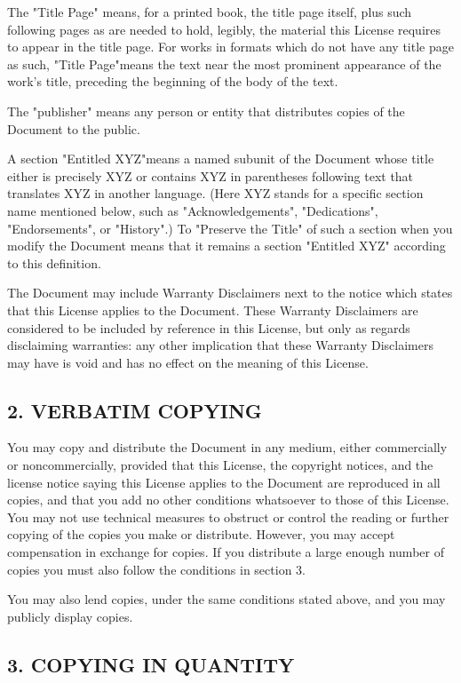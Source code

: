 The "Title Page" means, for a printed book, the title page itself, plus such following pages as are needed to hold, 
legibly, the material this License requires to appear in the title page. For works in formats which do not have any 
title page as such, "Title Page"means the text near the most prominent appearance of the work's title, preceding 
the beginning of the body of the text.

The "publisher" means any person or entity that distributes copies of the Document to the public.

A section "Entitled XYZ"means a named subunit of the Document whose title either is precisely XYZ or contains XYZ 
in parentheses following text that translates XYZ in another language. (Here XYZ stands for a specific section name 
mentioned below, such as "Acknowledgements", "Dedications", "Endorsements", or "History".) To "Preserve the Title" of 
such a section when you modify the Document means that it remains a section "Entitled XYZ" according to this definition.

The Document may include Warranty Disclaimers next to the notice which states that this License applies to the Document. 
These Warranty Disclaimers are considered to be included by reference in this License, but only as regards disclaiming 
warranties: any other implication that these Warranty Disclaimers may have is void and has no effect on the meaning of this License.


\subsection*{2. VERBATIM COPYING}

You may copy and distribute the Document in any medium, either commercially or noncommercially, provided that this License, 
the copyright notices, and the license notice saying this License applies to the Document are reproduced in all copies, and 
that you add no other conditions whatsoever to those of this License. You may not use technical measures to obstruct or control 
the reading or further copying of the copies you make or distribute. However, you may accept compensation in exchange for copies. 
If you distribute a large enough number of copies you must also follow the conditions in section 3.

You may also lend copies, under the same conditions stated above, and you may publicly display copies.


\subsection*{3. COPYING IN QUANTITY}

